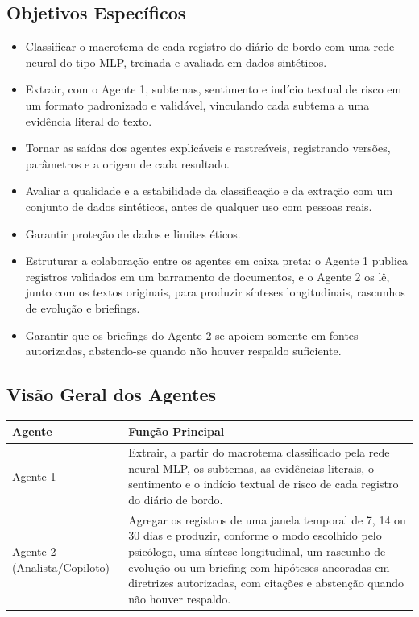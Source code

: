 \documentclass[12pt,a4paper]{article}
\newcommand{\cab}[1]{\textbf{#1}}
\begin{document}
\subsection{Objetivos Específicos}
\begin{itemize}
  \item Classificar o macrotema de cada registro do diário de bordo com uma rede neural do tipo MLP, treinada e avaliada em dados sintéticos.
  \item Extrair, com o Agente 1, subtemas, sentimento e indício textual de risco em um formato padronizado e validável, vinculando cada subtema a uma evidência literal do texto.
  \item Tornar as saídas dos agentes explicáveis e rastreáveis, registrando versões, parâmetros e a origem de cada resultado.
  \item Avaliar a qualidade e a estabilidade da classificação e da extração com um conjunto de dados sintéticos, antes de qualquer uso com pessoas reais.
  \item Garantir proteção de dados e limites éticos.
  \item Estruturar a colaboração entre os agentes em caixa preta: o Agente 1 publica registros validados em um barramento de documentos, e o Agente 2 os lê, junto com os textos originais, para produzir sínteses longitudinais, rascunhos de evolução e briefings.
  \item Garantir que os briefings do Agente 2 se apoiem somente em fontes autorizadas, abstendo-se quando não houver respaldo suficiente.
\end{itemize}

\subsection{Visão Geral dos Agentes}
\begin{tabularx}{\textwidth}{|p{3.5cm}|Y|}
  \hline
  \cab{Agente} & \cab{Função Principal} \\ \hline
  Agente 1 & Extrair, a partir do macrotema classificado pela rede neural MLP, os subtemas, as evidências literais, o sentimento e o indício textual de risco de cada registro do diário de bordo. \\ \hline
  Agente 2 (Analista/Copiloto) & Agregar os registros de uma janela temporal de 7, 14 ou 30 dias e produzir, conforme o modo escolhido pelo psicólogo, uma síntese longitudinal, um rascunho de evolução ou um briefing com hipóteses ancoradas em diretrizes autorizadas, com citações e abstenção quando não houver respaldo. \\ \hline
\end{tabularx}
\end{document}
